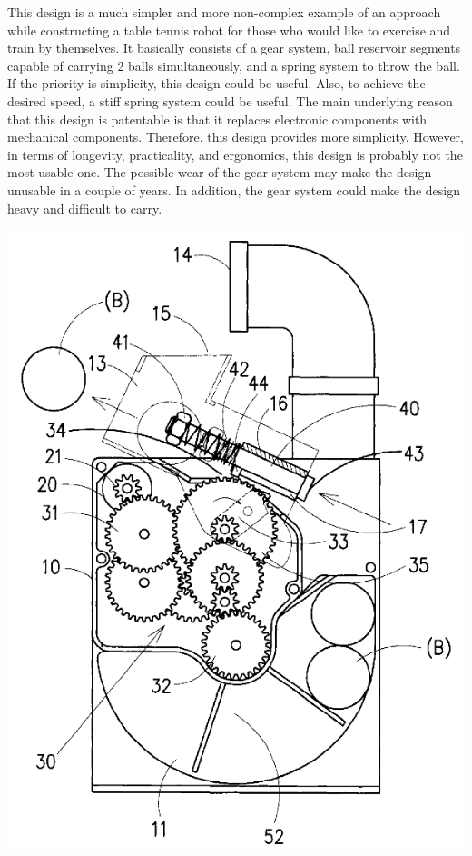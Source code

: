 \documentclass[12pt]{report}
\begin{document}
\begin{minipage}{0.7\textwidth}  %
    This design is a much simpler and more non-complex example of an approach while constructing a table tennis robot for those who would like to exercise and train by themselves. It basically consists of a gear system, ball reservoir segments capable of carrying 2 balls simultaneously, and a spring system to throw the ball. If the priority is simplicity, this design could be useful. Also, to achieve the desired speed, a stiff spring system could be useful. The main underlying reason that this design is patentable is that it replaces electronic components with mechanical components. Therefore, this design provides more simplicity. However, in terms of longevity, practicality, and ergonomics, this design is probably not the most usable one. The possible wear of the gear system may make the design unusable in a couple of years. In addition, the gear system could make the design heavy and difficult to carry.
\end{minipage}%
\hfill
\begin{minipage}{0.28\textwidth}  %
    \centering
    \includegraphics[width=\textwidth]{figures/patent2-1.png}
    \label{fig:pt2-1}
\end{minipage}
\end{document}
